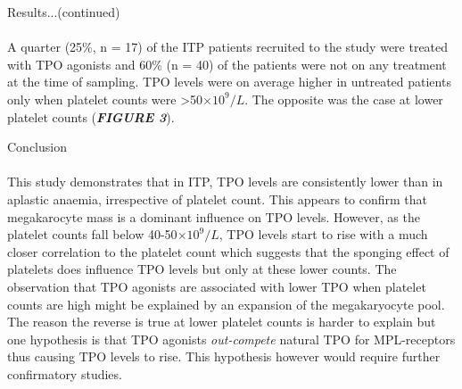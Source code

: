 \documentclass[landscape,a0paper,fontscale=0.285]{beamer} %
\newlength{\onecolwid}
\begin{document}
\begin{frame}[t]
\begin{columns}[t]
\begin{column}{\onecolwid}
\begin{block}{Results...(continued)}
\paragraph{} A quarter (25\%, n = 17) of the ITP patients recruited to the study were treated with TPO agonists and 60\% (n = 40) of the patients were not on any treatment at the time of sampling. TPO levels were on average higher in untreated patients only when  platelet counts were >50$\times 10^9/L$. The opposite was the case at lower platelet counts (\textbf{\emph{FIGURE 3}}).  

\end{block}


\begin{block}{Conclusion}

\paragraph{} This study demonstrates that in ITP, TPO levels are consistently lower than in aplastic anaemia, irrespective of platelet count. This appears to confirm that megakarocyte mass is a dominant influence on TPO levels. However, as the platelet counts fall below 40-50$\times10^9/L$, TPO levels start to rise with a much closer correlation to the platelet count which suggests that the sponging effect of platelets does influence TPO levels but only at these lower counts. The observation that TPO agonists are associated with lower TPO when platelet counts are high might be explained by an expansion of the megakaryocyte pool. The reason the reverse is true at lower platelet counts is harder to explain but one hypothesis is that TPO agonists \emph{out-compete} natural TPO for MPL-receptors thus causing TPO levels to rise. This hypothesis however would require further confirmatory studies.    

\end{block}





\end{column}
\end{columns}
\end{frame}
\end{document}
